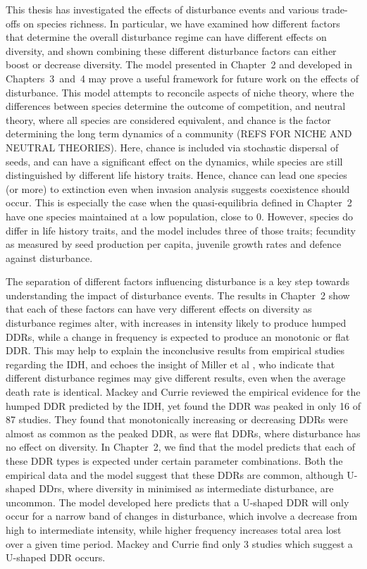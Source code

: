 \documentclass[preprint,10pt,reqno]{amsart}
\begin{document}
This thesis has investigated the effects of disturbance events and various trade-offs on species richness. In particular, we have examined  how different factors that determine the overall disturbance regime can have different effects on diversity, and shown combining these different disturbance factors can either boost or decrease diversity. The model presented in Chapter~2 and developed in Chapters~3~and~4 may prove a useful framework for future work on the effects of disturbance. This model attempts to reconcile aspects of niche theory, where the differences between species determine the outcome of competition, and neutral theory, where all species are considered equivalent, and chance is the factor determining the long term dynamics of a community (REFS FOR NICHE AND NEUTRAL THEORIES). Here, chance is included via stochastic dispersal of seeds, and can have a significant effect on the dynamics, while species are still distinguished by different life history traits. Hence, chance can lead one species (or more) to extinction even when invasion analysis suggests coexistence should occur. This is especially the case when the quasi-equilibria defined in Chapter~2 have one species maintained at a low population, close to 0. However, species do differ in life history traits, and the model includes three of those traits; fecundity as measured by seed production per capita, juvenile growth rates and defence against disturbance.

The separation of different factors influencing disturbance is a key step towards understanding the impact of disturbance events. The results in Chapter~2 show that each of these factors can have very different effects on diversity as disturbance regimes alter, with increases in intensity likely to produce humped DDRs, while a change in frequency is expected to produce an monotonic or flat DDR. This may help to explain the inconclusive results from empirical studies regarding the IDH, and echoes the insight of Miller et al \cite{miller2011frequency}, who indicate that different disturbance regimes may give different results, even when the average death rate is identical. Mackey and Currie \cite{mackey2001diversity} reviewed the empirical evidence for the humped DDR predicted by the IDH, yet found the DDR was peaked in only 16 of 87 studies. They found that monotonically increasing or decreasing DDRs were almost as common as the peaked DDR, as were flat DDRs, where disturbance has no effect on diversity. In Chapter~2, we find that the model predicts that each of these DDR types is expected under certain parameter combinations. Both the empirical data and the model suggest that these DDRs are common, although U-shaped DDrs, where diversity in minimised as intermediate disturbance, are uncommon. The model developed here predicts that a U-shaped DDR will only occur for a narrow band of changes in disturbance, which involve a decrease from high to intermediate intensity, while higher frequency increases total area lost over a given time period. Mackey and Currie find only 3 studies which suggest a U-shaped DDR occurs.
\end{document}
